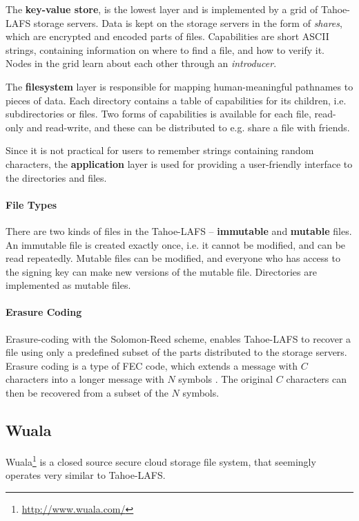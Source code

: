 \documentclass[pdftex,english,10pt,b5paper,twoside]{book}
\begin{document}
The \textbf{key-value store}, is the lowest layer and is implemented by a grid
of Tahoe-LAFS storage servers. Data is kept on the storage servers in the form
of \emph{shares}, which are encrypted and encoded parts of files. Capabilities
are short ASCII strings, containing information on where to find a file, and
how to verify it.  Nodes in the grid learn about each other through an
\emph{introducer}.

The \textbf{filesystem} layer is responsible for mapping human-meaningful
pathnames to pieces of data. Each directory contains a table of capabilities
for its children, i.e. subdirectories or files. Two forms of capabilities is
available for each file, read-only and read-write, and these can be distributed
to e.g. share a file with friends.

Since it is not practical for users to remember strings containing random
characters, the \textbf{application} layer is used for providing a user-friendly
interface to the directories and files.

\paragraph{File Types}

There are two kinds of files in the Tahoe-\ac{LAFS} -- \textbf{immutable} and
\textbf{mutable} files. An immutable file is created exactly once, i.e. it
cannot be modified, and can be read repeatedly. Mutable files can be modified,
and everyone who has access to the signing key can make new versions of
the mutable file. Directories are implemented as mutable files.

\paragraph{Erasure Coding}

Erasure-coding with the Solomon-Reed scheme, enables Tahoe-\ac{LAFS} to recover
a file using only a predefined subset of the parts distributed to the storage
servers. Erasure coding is a type of \ac{FEC} code, which extends a message
with $C$ characters into a longer message with $N$ symbols
\cite{t_reed-solomon}. The original $C$ characters can then be recovered from a
subset of the $N$ symbols.

\subsection{Wuala}

Wuala\footnote{\url{http://www.wuala.com/}} is a closed source secure cloud
storage file system, that seemingly operates very similar to Tahoe-\ac{LAFS}.
\end{document}
